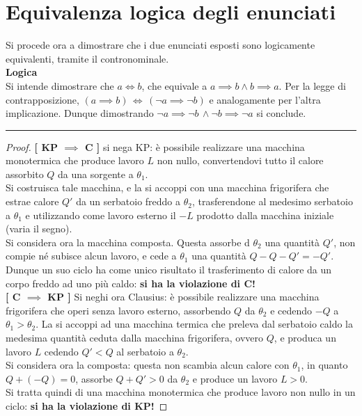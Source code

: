 \documentclass[10pt, oneside]{book}
\newcommand{\infobox}[2]{\vspace{0.5cm}~\\ \textbf{#1} \hrulefill \vspace{0.2cm}\\#2 {}\,\\\hrule \vspace{0.5cm}}
\begin{document}
\section{Equivalenza logica degli enunciati}
Si procede ora a dimostrare che i due enunciati esposti sono logicamente equivalenti, tramite il contronominale.
\infobox{Logica}{Si intende dimostrare che $a \Longleftrightarrow b$, che equivale a $a \implies b \land b \implies a$. Per la legge di contrapposizione, $(a \implies b) \, \Longleftrightarrow \, (\neg a \implies \neg b)$ e analogamente per l'altra implicazione. Dunque dimostrando $\neg a \implies \neg b \, \land \neg b \implies \neg a$ si conclude.}
\begin{proof}
\textbf{[ KP $\implies$ C ]} si nega KP: è possibile realizzare una macchina monotermica che produce lavoro $L$ non nullo, convertendovi tutto il calore assorbito $Q$ da una sorgente a $\theta_1$. \\
Si costruisca tale macchina, e la si accoppi con una macchina frigorifera che estrae calore $Q'$ da un serbatoio freddo a $\theta_2$, trasferendone al medesimo serbatoio a $\theta_1$ e utilizzando come lavoro esterno il $-L$ prodotto dalla macchina iniziale (varia il segno). \\
Si considera ora la macchina composta. Questa assorbe d $\theta_2$ una quantità $Q'$, non compie né subisce alcun lavoro, e cede a $\theta_1$ una quantità $Q - Q - Q' = - Q'$.\\
Dunque un suo ciclo ha come unico risultato il trasferimento di calore da un corpo freddo ad uno più caldo: \textbf{si ha la violazione di C!}\\
\textbf{[ C $\implies$ KP ]} Si neghi ora Clausius: è possibile realizzare una macchina frigorifera che operi senza lavoro esterno, assorbendo $Q$ da $\theta_2$ e cedendo $-Q$ a $\theta_1 > \theta_2$. La si accoppi ad una macchina termica che preleva dal serbatoio caldo la medesima quantità ceduta dalla macchina frigorifera, ovvero $Q$, e produca un lavoro $L$ cedendo $Q' < Q$ al serbatoio a $\theta_2$.\\
Si considera ora la composta: questa non scambia alcun calore con $\theta_1$, in quanto $Q + (-Q) = 0$, assorbe $Q + Q' > 0$ da $\theta_2$ e produce un lavoro $L > 0$.\\
Si tratta quindi di una macchina monotermica che produce lavoro non nullo in un ciclo: \textbf{si ha la violazione di KP!}
\end{proof}
\end{document}
